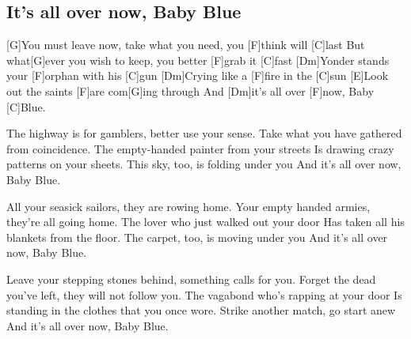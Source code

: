 \subsection*{It's all over now, Baby Blue   }
\begin{guitar}
[G]You must leave now, take what you need, you [F]think will [C]last
But what[G]ever you wish to keep, you better [F]grab it [C]fast
[Dm]Yonder stands your [F]orphan with his [C]gun
[Dm]Crying like a [F]fire in the [C]sun
[E]Look out the saints [F]are com[G]ing through
And [Dm]it's all over [F]now, Baby [C]Blue.



The highway is for gamblers, better use your sense.
Take what you have gathered from coincidence.
The empty-handed painter from your streets
Is drawing crazy patterns on your sheets.
This sky, too, is folding under you
And it's all over now, Baby Blue.



All your seasick sailors, they are rowing home.
Your empty handed armies, they're all going home.
The lover who just walked out your door
Has taken all his blankets from the floor.
The carpet, too, is moving under you
And it's all over now, Baby Blue.



Leave your stepping stones behind, something calls for you.
Forget the dead you've left, they will not follow you.
The vagabond who's rapping at your door
Is standing in the clothes that you once wore.
Strike another match, go start anew
And it's all over now, Baby Blue.
\end{guitar}
